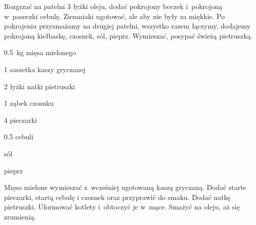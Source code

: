 \documentclass[../main.tex]{subfiles}
\begin{document}
Rozgrzać na patelni \num{3} łyżki oleju, dodać pokrojony boczek i~pokrojoną
w~paseczki cebulę. Ziemniaki ugotować, ale aby nie były za miękkie. Po
pokrojeniu przysmażamy na drugiej patelni, wszystko razem łączymy, dodajemy
pokrojoną kiełbaskę, czosnek, sól, pieprz. Wymieszać, posypać świeżą
pietruszką.


\begin{Ingred}
    \item \qty{0.5}{\kilo\gram} mięsa mielonego
    \item \num{1} saszetka kaszy gryczanej
    \item \num{2} łyżki natki pietruszki
    \item \num{1} ząbek czosnku
    \item \num{4} pieczarki
    \item \num{0.5} cebuli
    \item sól
    \item pieprz
\end{Ingred}

Mięso mielone wymieszać z~wcześniej ugotowaną kaszą gryczaną. Dodać starte
pieczarki, startą cebulę i czosnek oraz przyprawić do smaku. Dodać natkę
pietruszki. Uformować kotlety i~obtoczyć je w~mące. Smażyć na oleju, aż się
zrumienią.
\end{document}
